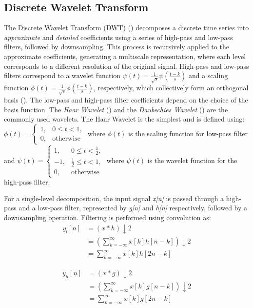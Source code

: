 \subsection{Discrete Wavelet Transform} 
\label{sec:dwt}
The Discrete Wavelet Transform (DWT) (\cite{b1}) decomposes a discrete time series into \emph{approximate} and
\emph{detailed} coefficients using a series of high-pass and low-pass filters, followed by downsampling.  This process
is recursively applied to the approximate coefficients, generating a multiscale representation, where each level
corresponds to a different resolution of the original signal. High-pass and low-pass filters correspond to a wavelet
function $\psi(t) = \frac{1}{\sqrt{s}} \psi (\frac{t-k}{s})$ and a scaling function $\phi(t) = \frac{1}{\sqrt{s}} \phi
(\frac{t-k}{s})$, respectively, which collectively form an orthogonal basis (\cite{wave-rora}).  The low-pass and
high-pass filter coefficients depend on the choice of the basis function. The {\em Haar Wavelet} (\cite{haar}) and the
{\em Daubechies Wavelet} (\cite{daubechies}) are the commonly used wavelets. The Haar Wavelet is the simplest and is defined using: \( \phi(t) = \begin{cases} 
1, & 0 \leq t < 1, \\ 
0, & \text{otherwise} 
\end{cases} \) where $\phi(t)$ is the scaling function for low-pass filter and \( \psi(t) = \begin{cases} 
1, & 0 \leq t < \frac{1}{2}, \\ 
-1, & \frac{1}{2} \leq t < 1, \\ 
0, & \text{otherwise} 
\end{cases} \) where $\psi(t)$ is the wavelet function for the high-pass filter.

For a single-level decomposition, the input signal {\em x[n]} is passed through a high-pass and a low-pass filter,
represented by {\em g[n]} and {\em h[n]} respectively, followed by a downsampling operation. Filtering is performed
using convolution as:
\begin{align}
\label{eq:low}
   y_{l}[n] &= (x \ast h) \downarrow 2  \nonumber \\
   &= \left( \sum_{k=-\infty}^{\infty} x[k] h[n-k] \right) \downarrow 2 \nonumber \\
    &= \sum_{k=-\infty}^{\infty} x[k] h[2n-k]
\end{align}

\begin{align}
\label{eq:high}
   y_{h}[n] &= (x \ast g) \downarrow 2 \nonumber\\
   &= \left( \sum_{k=-\infty}^{\infty} x[k] g[n-k] \right) \downarrow 2 \nonumber \\
    &= \sum_{k=-\infty}^{\infty} x[k] g[2n-k]
\end{align}

